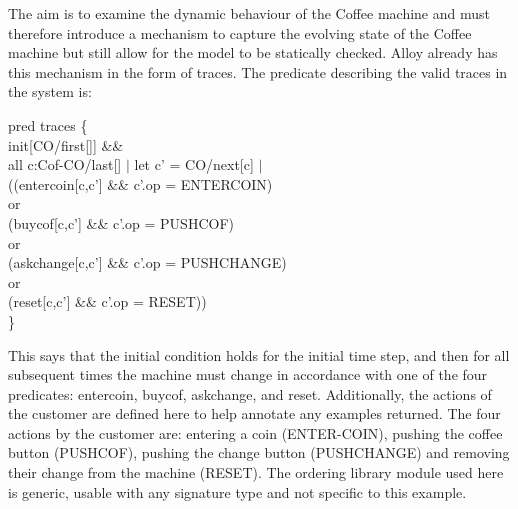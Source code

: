 \documentclass[a4paper,12pt]{extarticle}
\begin{document}
The aim is to examine the dynamic behaviour of the Coffee machine and must therefore introduce a mechanism to capture the evolving state of the Coffee machine but still allow for the model to be statically checked. Alloy already has this mechanism in the form of traces. The predicate describing the valid traces in the system is:\\
\begin{algorithm}
pred traces \{ \\
init[CO/first[]] \&\& \\
all c:Cof-CO/last[] $|$ let c' = CO/next[c] $|$ \\
((entercoin[c,c'] \&\& c'.op = ENTERCOIN)\\
or\\
(buycof[c,c'] \&\& c'.op = PUSHCOF)\\
or\\
(askchange[c,c'] \&\& c'.op = PUSHCHANGE)\\
or\\
(reset[c,c'] \&\& c'.op = RESET))\\
\}\\
\end{algorithm}

This says that the initial condition holds for the initial time step, and then for all subsequent times the machine must change in accordance with one of the four predicates: entercoin, buycof, askchange, and reset. Additionally, the actions of the customer are defined here to help annotate any examples returned. The four actions by the customer are: entering a coin (ENTER-COIN), pushing the coffee button (PUSHCOF), pushing the change button (PUSHCHANGE) and removing their change from the machine (RESET). The ordering library module used here is generic, usable with any signature type and not specific to this example.\\
\end{document}
